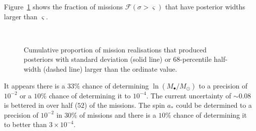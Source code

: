 \documentclass[useAMS,usedcolumn,usegraphicx,usenatbib]{mn2e}
\newcommand{\Figref}[1]{Figure~\ref{fig:#1}}
\begin{document}
\Figref{Widths} shows the fraction of missions $\mathcal{F}(\sigma > \varsigma)$ that have posterior widths larger than $\varsigma$.
\begin{figure}
\begin{center}
    \quad 
    \\
    \quad
\caption{Cumulative proportion of mission realisations that produced posteriors with standard deviation (solid line) or $68$-percentile half-width (dashed line) larger than the ordinate value.\label{fig:Widths}}
  \end{center}
\end{figure}
It appears there is a $33\%$ chance of determining $\ln (M_\bullet/M_\odot)$ to a precision of $10^{-2}$ or a $10\%$ chance of determining it to $10^{-4}$. The current uncertainty of $\sim 0.08$ is bettered in over half ($52$) of the missions. The spin $a_\ast$ could be determined to a precision of $10^{-2}$ in $30\%$ of missions and there is a $10\%$ chance of determining it to better than $3\times 10^{-4}$.
\end{document}

